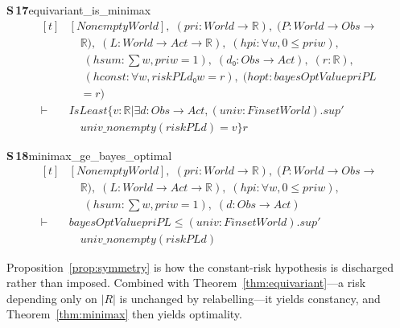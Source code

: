 \documentclass[conference]{IEEEtran}
\theoremstyle{definition}
\newcommand{\lean}[1]{\textsf{\footnotesize #1}}
\begin{document}
\noindent\textbf{S\,17}\quad\lean{equivariant\_is\_minimax}
{\footnotesize\[ \begin{aligned}[t]
&[\mathit{Nonempty} \mathit{World}],\; (\mathit{pri} : \mathit{World} \to \mathbb{R} ),\; (\mathit{P} : \mathit{World} \to \mathit{Obs} \to\\
&\quad \mathbb{R} ),\; (\mathit{L} : \mathit{World} \to \mathit{Act} \to \mathbb{R} ),\; (\mathit{hpi} : \forall \mathit{w}, 0 \leq \mathit{pri} \mathit{w}),\\
&\quad \; (\mathit{hsum} : \textstyle\sum \mathit{w}, \mathit{pri} \mathit{w} = 1),\; (\mathit{d₀} : \mathit{Obs} \to \mathit{Act}),\; (\mathit{r} : \mathbb{R} ),\\
&\quad \; (\mathit{hconst} : \forall \mathit{w}, \mathit{risk} \mathit{P} \mathit{L} \mathit{d₀} \mathit{w} = \mathit{r}),\; (\mathit{hopt} : \mathit{bayesOptValue} \mathit{pri} \mathit{P} \mathit{L}\\
&\quad = \mathit{r})\\
\vdash\;&\mathit{IsLeast} \{ \mathit{v} : \mathbb{R} | \exists \mathit{d} : \mathit{Obs} \to \mathit{Act}, (\mathit{univ} : \mathit{Finset} \mathit{World}).\mathit{sup'}\\
&\quad \mathit{univ\_nonempty} (\mathit{risk} \mathit{P} \mathit{L} \mathit{d}) = \mathit{v}\} \mathit{r}
\end{aligned} \]}

\noindent\textbf{S\,18}\quad\lean{minimax\_ge\_bayes\_optimal}
{\footnotesize\[ \begin{aligned}[t]
&[\mathit{Nonempty} \mathit{World}],\; (\mathit{pri} : \mathit{World} \to \mathbb{R} ),\; (\mathit{P} : \mathit{World} \to \mathit{Obs} \to\\
&\quad \mathbb{R} ),\; (\mathit{L} : \mathit{World} \to \mathit{Act} \to \mathbb{R} ),\; (\mathit{hpi} : \forall \mathit{w}, 0 \leq \mathit{pri} \mathit{w}),\\
&\quad \; (\mathit{hsum} : \textstyle\sum \mathit{w}, \mathit{pri} \mathit{w} = 1),\; (\mathit{d} : \mathit{Obs} \to \mathit{Act})\\
\vdash\;&\mathit{bayesOptValue} \mathit{pri} \mathit{P} \mathit{L} \leq (\mathit{univ} : \mathit{Finset} \mathit{World}).\mathit{sup'}\\
&\quad \mathit{univ\_nonempty} (\mathit{risk} \mathit{P} \mathit{L} \mathit{d})
\end{aligned} \]}


Proposition~\ref{prop:symmetry} is how the constant-risk hypothesis is discharged rather than
imposed. Combined with Theorem~\ref{thm:equivariant}---a risk depending only on $|R|$ is
unchanged by relabelling---it yields constancy, and Theorem~\ref{thm:minimax} then yields
optimality.
\end{document}
